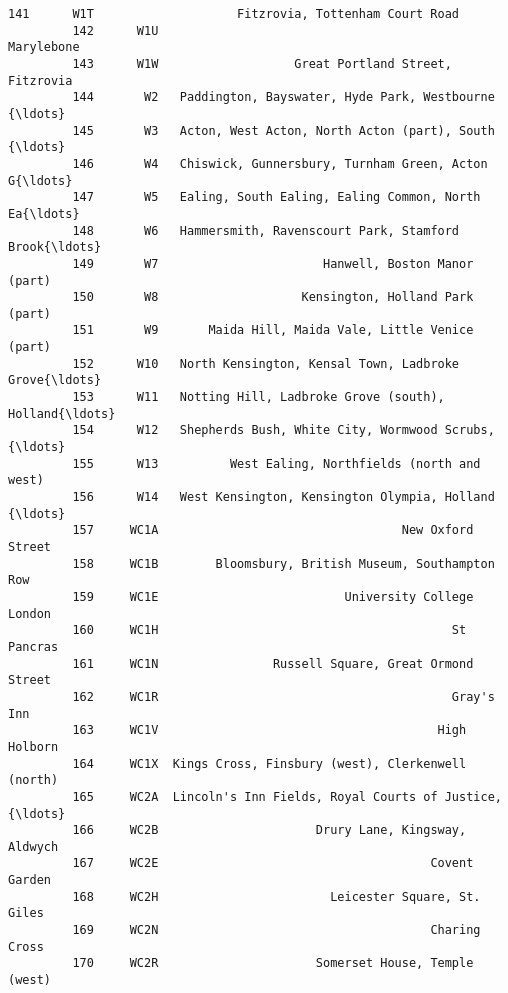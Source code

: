 \documentclass[11pt]{article}
\begin{document}
\begin{Verbatim}[commandchars=\\\{\}]
         141      W1T                    Fitzrovia, Tottenham Court Road   
         142      W1U                                         Marylebone   
         143      W1W                   Great Portland Street, Fitzrovia   
         144       W2   Paddington, Bayswater, Hyde Park, Westbourne {\ldots}   
         145       W3   Acton, West Acton, North Acton (part), South {\ldots}   
         146       W4   Chiswick, Gunnersbury, Turnham Green, Acton G{\ldots}   
         147       W5   Ealing, South Ealing, Ealing Common, North Ea{\ldots}   
         148       W6   Hammersmith, Ravenscourt Park, Stamford Brook{\ldots}   
         149       W7                       Hanwell, Boston Manor (part)   
         150       W8                    Kensington, Holland Park (part)   
         151       W9       Maida Hill, Maida Vale, Little Venice (part)   
         152      W10   North Kensington, Kensal Town, Ladbroke Grove{\ldots}   
         153      W11   Notting Hill, Ladbroke Grove (south), Holland{\ldots}   
         154      W12   Shepherds Bush, White City, Wormwood Scrubs, {\ldots}   
         155      W13          West Ealing, Northfields (north and west)   
         156      W14   West Kensington, Kensington Olympia, Holland {\ldots}   
         157     WC1A                                  New Oxford Street   
         158     WC1B        Bloomsbury, British Museum, Southampton Row   
         159     WC1E                          University College London   
         160     WC1H                                         St Pancras   
         161     WC1N                Russell Square, Great Ormond Street   
         162     WC1R                                         Gray's Inn   
         163     WC1V                                       High Holborn   
         164     WC1X  Kings Cross, Finsbury (west), Clerkenwell (north)   
         165     WC2A  Lincoln's Inn Fields, Royal Courts of Justice,{\ldots}   
         166     WC2B                      Drury Lane, Kingsway, Aldwych   
         167     WC2E                                      Covent Garden   
         168     WC2H                        Leicester Square, St. Giles   
         169     WC2N                                      Charing Cross   
         170     WC2R                      Somerset House, Temple (west)   
         

\end{Verbatim}
\end{document}
